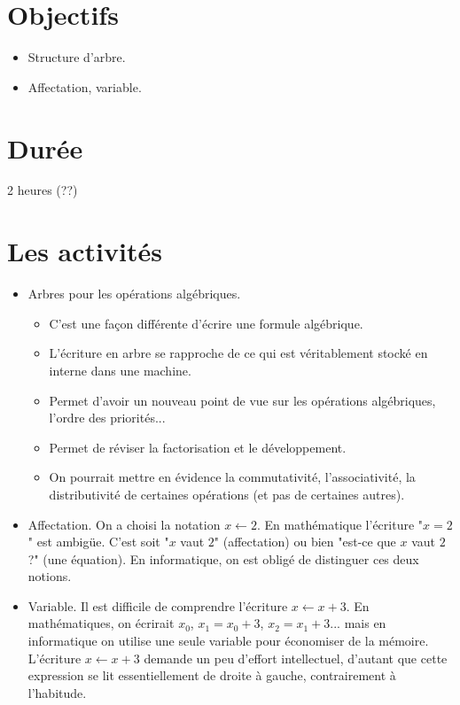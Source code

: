\documentclass[class=report,crop=false, 12pt]{standalone}
\begin{document}



\section*{Objectifs}

\begin{itemize}
  \item Structure d'arbre.
  \item Affectation, variable.
\end{itemize}


\section*{Durée}

2 heures (??)

\section*{Les activités}

\begin{itemize}
  \item Arbres pour les opérations algébriques.
  \begin{itemize}
    \item C'est une façon différente d'écrire une formule algébrique.
    \item L'écriture en arbre se rapproche de ce qui est véritablement stocké en interne dans une machine.
    \item Permet d'avoir un nouveau point de vue sur les opérations algébriques, l'ordre des priorités... 
    \item Permet de réviser la factorisation et le développement.
    \item On pourrait mettre en évidence la commutativité, l'associativité, la distributivité de certaines opérations (et pas de certaines autres).
  \end{itemize}
  
  \item Affectation. On a choisi la notation $x \leftarrow 2$. En mathématique l'écriture "$x=2$" est ambigüe. C'est soit "$x$ vaut $2$" (affectation) ou bien "est-ce que $x$ vaut $2$ ?" (une équation). En informatique, on est obligé de distinguer ces deux notions.

  \item Variable. Il est difficile de comprendre l'écriture $x \leftarrow x +3$. En mathématiques, on écrirait $x_0$, $x_1 = x_0+3$, $x_2 =x_1+3$... mais en informatique on utilise une seule variable pour économiser de la mémoire. L'écriture $x \leftarrow x +3$ demande un peu d'effort intellectuel, d'autant que cette expression se lit essentiellement de droite à gauche, contrairement à l'habitude.

\end{itemize}
\end{document}

